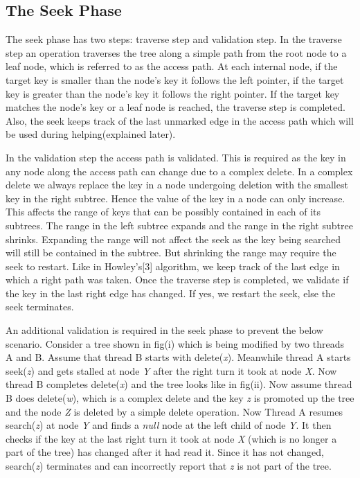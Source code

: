 \documentclass[11pt]{article}
\begin{document}
\begin{multicols}{2}
\subsection{The Seek Phase}
The seek phase has two steps: traverse step and validation step. In the traverse step an operation traverses the tree along a simple path from the root node to a leaf node, which is referred to as the access path. At each internal node, if the target key is smaller than the node's key it follows the left pointer, if the target key is greater than the node's key it follows the right pointer. If the target key matches the node's key or a leaf node is reached, the traverse step is completed. Also, the seek keeps track of the last unmarked edge in the access path which will be used during helping(explained later). \par
In the validation step the access path is validated. This is required as the key in any node along the access path can change due to a complex delete. In a complex delete we always replace the key in a node undergoing deletion with the smallest key in the right subtree. Hence the value of the key in a node can only increase. This affects the range of keys that can be possibly contained in each of its subtrees. The range in the left subtree expands and the range in the right subtree shrinks. Expanding the range will not affect the seek as the key being searched will still be contained in the subtree. But shrinking the range may require the seek to restart. Like in Howley's[3] algorithm, we keep track of the last edge in which a right path was taken. Once the traverse step is completed, we validate if the key in the last right edge has changed. If yes, we restart the seek, else the seek terminates. \par
An additional validation is required in the seek phase to prevent the below scenario. Consider a tree shown in fig(i) which is being modified by two threads A and B. Assume that thread B starts with delete(\textit{x}). Meanwhile thread A starts seek(\textit{z}) and gets stalled at node \textit{Y} after the right turn it took at node \textit{X}. Now thread B completes delete(\textit{x}) and the tree looks like in fig(ii). Now assume thread B does delete(\textit{w}), which is a complex delete and the key \textit{z} is promoted up the tree and the node \textit{Z} is deleted by a simple delete operation. Now Thread A resumes search(\textit{z}) at node \textit{Y} and finds a \textit{null} node at the left child of node \textit{Y}. It then checks if the key at the last right turn it took at node \textit{X} (which is no longer  a part of the tree) has changed after it had read it. Since it has not changed, search(\textit{z}) terminates and can incorrectly report that \textit{z} is not part of the tree. \par

\end{multicols}
\end{document}
